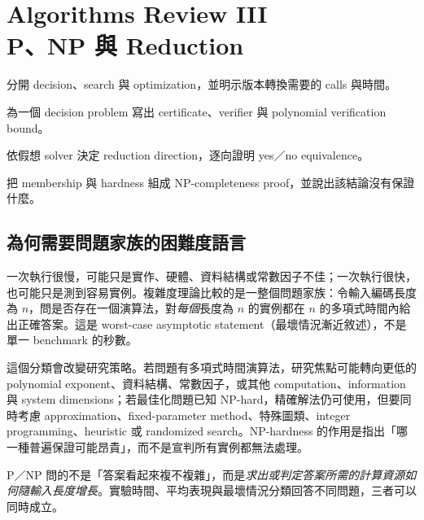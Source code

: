 \documentclass[11pt,a4paper,oneside,openany]{book}
\begin{document}
\chapter[Algorithms Review III：P、NP 與 Reduction]{Algorithms Review III\\P、NP 與 Reduction}
\label{ch:complexity}
\begin{chaptermastery}
\item 分開 decision、search 與 optimization，並明示版本轉換需要的 calls 與時間。
\item 為一個 decision problem 寫出 certificate、verifier 與 polynomial verification bound。
\item 依假想 solver 決定 reduction direction，逐向證明 yes／no equivalence。
\item 把 membership 與 hardness 組成 NP-completeness proof，並說出該結論沒有保證什麼。
\end{chaptermastery}

\section{為何需要問題家族的困難度語言}
一次執行很慢，可能只是實作、硬體、資料結構或常數因子不佳；一次執行很快，也可能只是測到容易實例。複雜度理論比較的是一整個問題家族：令輸入編碼長度為 $n$，問是否存在一個演算法，對\emph{每個}長度為 $n$ 的實例都在 $n$ 的多項式時間內給出正確答案。這是 worst-case asymptotic statement（最壞情況漸近敘述），不是單一 benchmark 的秒數。

這個分類會改變研究策略。若問題有多項式時間演算法，研究焦點可能轉向更低的 polynomial exponent、資料結構、常數因子，或其他 computation、information 與 system dimensions；若最佳化問題已知 NP-hard，精確解法仍可使用，但要同時考慮 approximation、fixed-parameter method、特殊圖類、integer programming、heuristic 或 randomized search。NP-hardness 的作用是指出「哪一種普遍保證可能昂貴」，而不是宣判所有實例都無法處理。

\begin{coreintuition}
P／NP 問的不是「答案看起來複不複雜」，而是\emph{求出或判定答案所需的計算資源如何隨輸入長度增長}。實驗時間、平均表現與最壞情況分類回答不同問題，三者可以同時成立。
\end{coreintuition}
\end{document}
